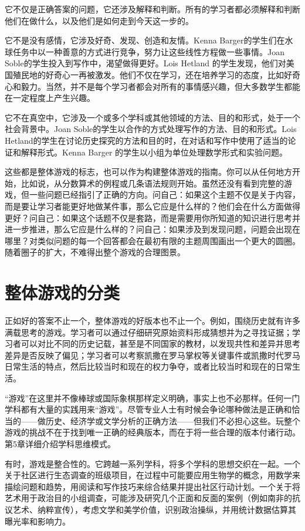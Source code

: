 它不仅是正确答案的问题，它还涉及解释和判断。所有的学习者都必须解释和判断他们在做什么，以及他们是如何走到今天这一步的。

它不是没有感情，它涉及好奇、发现、创造和友情。Kenna Barger的学生们在水球任务中以一种善意的方式进行竞争，努力让这些线性方程做一些事情。Joan Soble的学生投入到写作中，渴望做得更好。Lois Hetland 的学生发现，他们对美国殖民地的好奇心一再被激发。他们不仅在学习，还在培养学习的态度，比如好奇心和毅力。当然，并不是每个学习者都会对所有的事情感兴趣，但大多数学生都能在一定程度上产生兴趣。

它不在真空中，它涉及一个或多个学科或其他领域的方法、目的和形式，处于一个社会背景中。Joan Soble的学生以合作的方式处理写作的方法、目的和形式。Lois Hetland的学生在讨论历史探究的方法和目的时，在对话和写作中使用了适当的论证和解释形式。Kenna Barger 的学生以小组为单位处理数学形式和实验问题。

这些都是整体游戏的标志，也可以作为构建整体游戏的指南。你可以从任何地方开始，比如说，从分数算术的例程或几条语法规则开始。虽然还没有看到完整的游戏，但一些问题已经指引了正确的方向。问自己：如果这个主题不仅是关于内容，而是要让学习者能更好地做某件事，那么它应是什么样的？他们会在什么方面做得更好？问自己：如果这个话题不仅是套路，而是需要用你所知道的知识进行思考并进一步推进，那么它应是什么样的？问自己：如果涉及到发现问题，问题会出现在哪里？对类似问题的每一个回答都会在最初有限的主题周围画出一个更大的圆圈。随着圈子的扩大，不难得出整个游戏的合理图景。

\section*{整体游戏的分类}

正如好的答案不止一个，整体游戏的好版本也不止一个。例如，围绕历史就有许多满载思考的游戏。学习者可以通过仔细研究原始资料形成猜想并为之寻找证据；学习者可以对比不同的历史记载，甚至是不同国家的教材，以发现共性和差异并思考差异是否反映了偏见；学习者可以考察凯撒在罗马掌权等关键事件或凯撒时代罗马日常生活的特点，然后比较当时和现在的权力争夺，或者比较当时和现在的日常生活。

“游戏”在这里并不像棒球或国际象棋那样定义明确，事实上也不必那样。任何一门学科都有大量的实践用来“游戏”。尽管专业人士有时候会争论哪种做法是正确和恰当的——做历史、经济学或文学分析的正确方法——但我们不必担心这些。玩整个游戏的挑战不在于找到唯一正确的经典版本，而在于将一些合理的版本付诸行动。第5章详细介绍学科思维模式。

有时，游戏是整合性的。它跨越一系列学科，将多个学科的思想交织在一起。一个关于社区进行生态调查的班级项目，在过程中可能要应用生物学的概念，用数学来描绘问题和趋势，用阅读和写作技巧来综合结果并提出社区行动计划。一个关于将艺术用于政治目的小组调查，可能涉及研究几个正面和反面的案例（例如南非的抗议艺术、纳粹宣传），考虑文学和美学价值，识别政治操纵，并用统计数据估算其曝光率和影响力。

